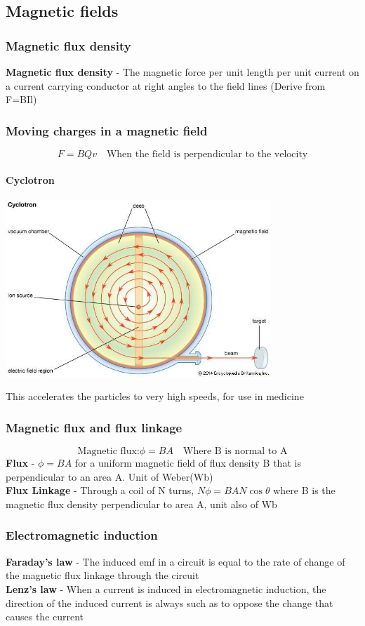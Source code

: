 \documentclass[12pt]{article}
\begin{document}
\subsection{Magnetic fields}
\subsubsection{Magnetic flux density}
\textbf{Magnetic flux density} - The magnetic force per unit length per unit current on a current carrying conductor at right angles to the field lines (Derive from F=BIl)
\subsubsection{Moving charges in a magnetic field}
$$F=BQv \quad \textrm{When the field is perpendicular to the velocity}$$
\paragraph{Cyclotron}
\begin{center}
\includegraphics[width=10cm]{cyclotron.jpg}
\end{center}
This accelerates the particles to very high speeds, for use in medicine
\subsubsection{Magnetic flux and flux linkage}
$$\textrm{Magnetic flux:}\phi=BA \quad \textrm{Where B is normal to A}$$
\textbf{Flux} - $\phi=BA$ for a uniform magnetic field of flux density B that is perpendicular to an area A. Unit of Weber(Wb)\\
\textbf{Flux Linkage} - Through a coil of N turns, $N\phi=BAN\cos\theta$ where B is the magnetic flux density perpendicular to area A, unit also of Wb
\subsubsection{Electromagnetic induction}
\textbf{Faraday's law} - The induced emf in a circuit is equal to the rate of change of the magnetic flux linkage through the circuit\\
\textbf{Lenz's law} - When a current is induced in electromagnetic induction, the direction of the induced current is always such as to oppose the change that causes the current
\end{document}

